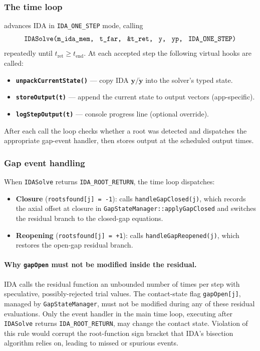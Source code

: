 \documentclass[11pt,a4paper]{article}
\begin{document}
\subsubsection*{The time loop}

 advances IDA in \texttt{IDA\_ONE\_STEP} mode, calling
\begin{equation*}
  \texttt{IDASolve(m\_ida\_mem,\; t\_far,\; \&t\_ret,\; y,\; yp,\; IDA\_ONE\_STEP)}
\end{equation*}
repeatedly until $t_\mathrm{ret} \geq t_\mathrm{end}$.  At each accepted step the following virtual hooks are called:
\begin{itemize}
  \item \textbf{\texttt{unpackCurrentState()}} — copy IDA $\mathbf{y}/\dot{\mathbf{y}}$ into the solver's typed state.
  \item \textbf{\texttt{storeOutput(t)}} — append the current state to output vectors (app-specific).
  \item \textbf{\texttt{logStepOutput(t)}} — console progress line (optional override).
\end{itemize}
After each call the loop checks whether a root was detected and dispatches the appropriate gap-event handler, then stores output at the scheduled output times.

\subsubsection*{Gap event handling}

When \texttt{IDASolve} returns \texttt{IDA\_ROOT\_RETURN}, the time loop dispatches:
\begin{itemize}
  \item \textbf{Closure} (\texttt{rootsfound[j] = -1}): calls \texttt{handleGapClosed(j)}, which records the axial offset at closure in \texttt{GapStateManager::applyGapClosed} and switches the residual branch to the closed-gap equations.
  \item \textbf{Reopening} (\texttt{rootsfound[j] = +1}): calls \texttt{handleGapReopened(j)}, which restores the open-gap residual branch.
\end{itemize}

\paragraph{Why \texttt{gapOpen} must not be modified inside the residual.}
IDA calls the residual function an unbounded number of times per step with speculative, possibly-rejected trial values.  The contact-state flag \texttt{gapOpen[j]}, managed by \texttt{GapStateManager}, must not be modified during any of these residual evaluations.  Only the event handler in the main time loop, executing after \texttt{IDASolve} returns \texttt{IDA\_ROOT\_RETURN}, may change the contact state.  Violation of this rule would corrupt the root-function sign bracket that IDA's bisection algorithm relies on, leading to missed or spurious events.
\end{document}
